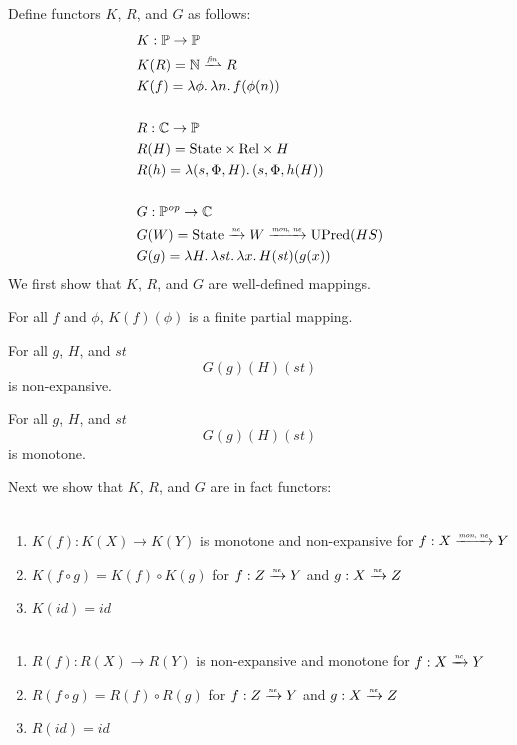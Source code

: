 \documentclass{article}
\newcommand{\forcenewline}{$\phantom{v}$\\}
\newcommand{\finparfun}{\xrightharpoonup{\textit{\tiny{fin}}}}
\newcommand{\monnefun}{\xrightarrow{\textit{\tiny{mon, ne}}}}
\newcommand{\nefun}{\xrightarrow{\textit{\tiny{ne}}}}
\newcommand{\id}{\var{id}}
\newcommand{\CatC}{\mathbb{C}}
\newcommand{\CatP}{\mathbb{P}}
\newcommand{\var}[1]{\mathit{#1}}
\newcommand{\plaindom}[1]{\mathrm{#1}}
\newcommand{\nats}{\mathbb{N}}
\newcommand{\Rel}{\plaindom{Rel}}
\newcommand{\States}{\plaindom{State}}
\newcommand{\UPred}[1]{\plaindom{UPred}(#1)}
\begin{document}
Define functors $K$, $R$, and $G$ as follows:
\begin{align*}
  & K : \CatP \rightarrow \CatP \\
  & K(R) = \nats \finparfun R \\
  & K(f) = \lambda \phi \ldotp \lambda n \ldotp f(\phi(n)) \\
  & \\
  & R : \CatC \rightarrow \CatP \\
  & R(H) = \States \times \Rel \times H\\
  & R(h) = \lambda (s,\Phi,H) \ldotp (s,\Phi,h(H))\\
  & \\
  & G : \CatP^{\var{op}} \rightarrow \CatC \\
  & G(W) = \States \nefun W \monnefun \UPred{HS} \\
  & G(g) = \lambda H \ldotp \lambda \var{st} \ldotp \lambda x \ldotp H (\var{st})(g(x))
\end{align*}
We first show that $K$, $R$, and $G$ are well-defined mappings.
\begin{lemma}
  \label{lem:world-finpar}
  For all $f$ and $\phi$, $K(f)(\phi)$ is a finite partial mapping.
\end{lemma}
\begin{lemma}
\label{lem:HSP-mon}
For all $g$, $H$, and $\var{st}$
\[
G(g) (H) (\var{st})
\]
is non-expansive.
\end{lemma}
\begin{lemma}
\label{lem:HSP-ne}
For all $g$, $H$, and $\var{st}$
\[
G(g) (H) (\var{st})
\]
is monotone.
\end{lemma}
Next we show that $K$, $R$, and $G$ are in fact functors:
\begin{lemma}[$K$ functorial]\forcenewline
\label{lem:K-func}
  \begin{enumerate}
  \item $K(f) : K(X) \rightarrow K(Y)$ is monotone and non-expansive for $f : X \monnefun Y$
  \item $K(f \circ g) = K(f) \circ K(g)$ for $f : Z \nefun Y$ and $g : X \nefun Z$
  \item $K(\id) = \id$
  \end{enumerate}
\end{lemma}

\begin{lemma}[$R$ functorial]\forcenewline
\label{lem:R-func}
  \begin{enumerate}
  \item $R(f) : R(X) \rightarrow R(Y)$ is non-expansive and monotone for $f : X \nefun Y$
  \item $R(f \circ g) = R(f) \circ R(g)$ for $f : Z \nefun Y$ and $g : X \nefun Z$
  \item $R(\id) = \id$
  \end{enumerate}
\end{lemma}
\end{document}
